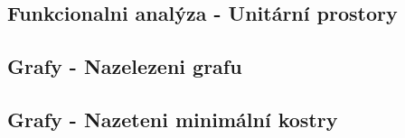 \documentclass[12pt,a4paper,notitlepage,final]{article}
\begin{document}
\subsection{Funkcionalni analýza - Unitární prostory}
\setcounter{section}{4}
\setcounter{subsection}{3}


\setcounter{section}{6}
\setcounter{subsection}{11}
\subsection{Grafy - Nazelezeni grafu}
\setcounter{section}{5}
\setcounter{subsection}{1}

\setcounter{section}{6}
\setcounter{subsection}{12}
\subsection{Grafy - Nazeteni minimální kostry}
\setcounter{section}{5}
\setcounter{subsection}{2}

\end{document}
